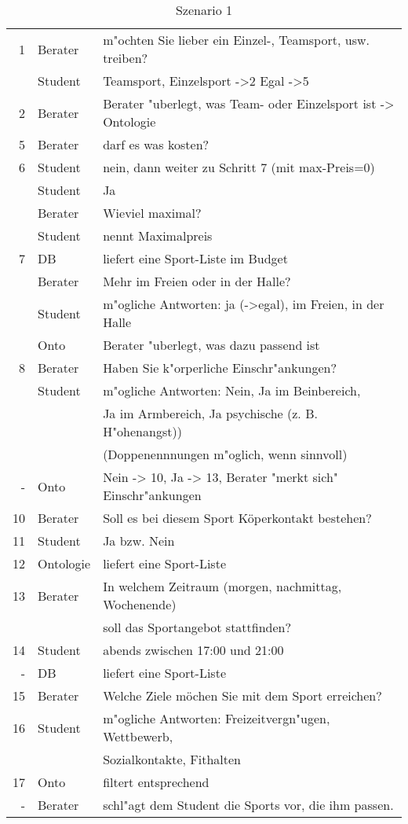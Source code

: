 \begin{table}
	\centering
		\begin{tabular}{|r|l|l|}
\hline
			
1 &	Berater &	m"ochten Sie lieber ein Einzel-, Teamsport, usw. treiben? \\
&	Student	& Teamsport, Einzelsport ->2 Egal ->5 \\
\hline
2	& Berater	& Berater "uberlegt, was Team- oder Einzelsport ist -> Ontologie \\
\hline
5 &	Berater &	darf es was kosten? \\
\hline
6 &	Student	& nein, dann weiter zu Schritt 7 (mit max-Preis=0) \\
	& Student	& Ja \\
	& Berater	& Wieviel maximal?\\
	& Student &	nennt Maximalpreis\\
\hline
7	& DB &	 liefert eine Sport-Liste im Budget\\
	& Berater &	Mehr im Freien oder in der Halle?\\
	& Student &	m"ogliche Antworten: ja (->egal), im Freien, in der Halle\\
	& Onto & Berater "uberlegt, was dazu passend ist\\
\hline
8	& Berater &	Haben Sie k"orperliche Einschr"ankungen?\\
	& Student &	m"ogliche Antworten: Nein, Ja im Beinbereich,\\
	& & Ja im Armbereich, Ja psychische (z. B. H"ohenangst)) \\ 
	&&(Doppenennnungen m"oglich, wenn sinnvoll)\\
\hline
-	& Onto & Nein -> 10, Ja -> 13, Berater "merkt sich" Einschr"ankungen \\
\hline
10 & Berater & Soll es bei diesem Sport Köperkontakt bestehen?\\
\hline
11 & Student & Ja bzw. Nein\\
\hline
12 & Ontologie & liefert eine Sport-Liste\\
\hline
13 & Berater & In welchem Zeitraum (morgen, nachmittag, Wochenende)\\
&& soll das Sportangebot stattfinden?\\
\hline
14 & Student & abends zwischen 17:00 und 21:00 \\
\hline
-	& DB &liefert eine Sport-Liste\\
\hline
15 & Berater & Welche Ziele möchen Sie mit dem Sport erreichen?\\
\hline
16 & Student & m"ogliche Antworten: Freizeitvergn"ugen, Wettbewerb,\\
&& Sozialkontakte, Fithalten\\
\hline
17 & Onto &	filtert entsprechend \\
\hline
-	& Berater &	schl"agt dem Student die Sports vor, die ihm passen.\\
\hline
		\end{tabular}
		
		\caption[Szenario 1]{Szenario 1}
\end{table}


